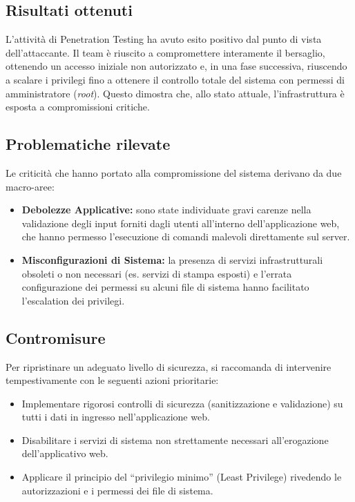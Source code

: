 \documentclass[11pt]{article}
\begin{document}
\subsection{Risultati ottenuti}
L'attività di Penetration Testing ha avuto esito positivo dal punto di vista dell'attaccante. Il team è riuscito a compromettere interamente il bersaglio, ottenendo un accesso iniziale non autorizzato e, in una fase successiva, riuscendo a scalare i privilegi fino a ottenere il controllo totale del sistema con permessi di amministratore (\textit{root}). Questo dimostra che, allo stato attuale, l'infrastruttura è esposta a compromissioni critiche.

\subsection{Problematiche rilevate}
Le criticità che hanno portato alla compromissione del sistema derivano da due macro-aree:
\begin{itemize}
    \item \textbf{Debolezze Applicative:} sono state individuate gravi carenze nella validazione degli input forniti dagli utenti all'interno dell'applicazione web, che hanno permesso l'esecuzione di comandi malevoli direttamente sul server.
    \item \textbf{Misconfigurazioni di Sistema:} la presenza di servizi infrastrutturali obsoleti o non necessari (es. servizi di stampa esposti) e l'errata configurazione dei permessi su alcuni file di sistema hanno facilitato l'escalation dei privilegi.
\end{itemize}

\subsection{Contromisure}
Per ripristinare un adeguato livello di sicurezza, si raccomanda di intervenire tempestivamente con le seguenti azioni prioritarie:
\begin{itemize}
    \item Implementare rigorosi controlli di sicurezza (sanitizzazione e validazione) su tutti i dati in ingresso nell'applicazione web.
    \item Disabilitare i servizi di sistema non strettamente necessari all'erogazione dell'applicativo web.
    \item Applicare il principio del ``privilegio minimo'' (Least Privilege) rivedendo le autorizzazioni e i permessi dei file di sistema.
\end{itemize}
\end{document}
